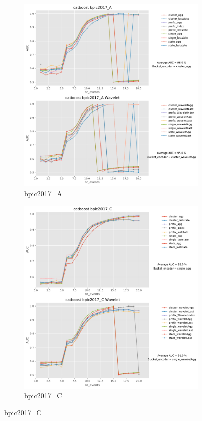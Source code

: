 \documentclass[twoside,11pt]{Latex/Classes/PhDthesisPSnPDF}
\begin{document}
\begin{figure}[!htbp] %
	
	\begin{subfigure}{0.48\textwidth}
		\includegraphics[width=\linewidth]{images/wavelet/graphs2cat/bpic2017_A.pdf}
		\caption{bpic2017\_A} 
	\end{subfigure}\hspace*{\fill}
	\begin{subfigure}{0.48\textwidth}
		\includegraphics[width=\linewidth]{images/wavelet/graphs2cat/bpic2017_C.pdf}
		\caption{bpic2017\_C}
	\end{subfigure}
	

\end{figure}
\end{document}
